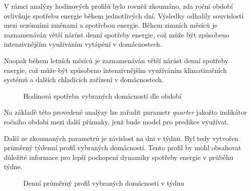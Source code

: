 \documentclass[FM,BP,fonts]{tulthesis}
\begin{document}
V rámci analýzy hodinových profilů bylo rovněž zkoumáno, zda roční období ovlivňuje spotřebu energie během jednotlivých dní. Výsledky odhalily souvislosti mezi sezónními změnami a spotřebou energie. Během zimních měsíců je zaznamenáván větší nárůst denní spotřeby energie, což může být způsobeno intenzivnějším využíváním vytápění v domácnostech.

Naopak během letních měsíců je zaznamenáván větší nárůst denní spotřeby energie, což může být způsobeno intenzivnějším využíváním klimatizačních systémů a dalších chladicích zařízení v domácnostech. \newpage

\begin{figure}[htbp]
	\centering
	\caption{Hodinová spotřeba vybraných domácností dle období}
	\label{fig:hodina_quarters}
\end{figure}

Na základě této provedené analýzy lze zařadit parametr \textit{quarter} jakožto indikátor ročního období mezi další příznaky, jenž bude model pro predikce využívat.

Další ze zkoumaných parametrů je závislost na dni v týdnu. Byl tedy vytvořen průměrný týdenní profil vybraných domácností. Tento profil by mohl obsahovat důležité informace pro lepší pochopení dynamiky spotřeby energie v průběhu týdne. 

\begin{figure}[htbp]
	\centering
	\caption{Denní průměrný profil vybraných domácností v týdnu}
	\label{fig:tyden_avg_group}
\end{figure}
\end{document}
